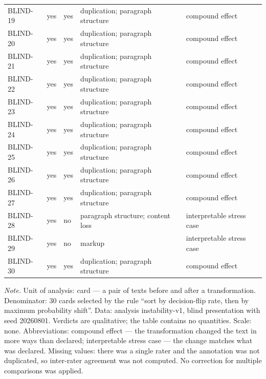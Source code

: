 \begin{longtable}{lllll}
BLIND-19 & yes & yes & duplication; paragraph structure & compound effect \\
BLIND-20 & yes & yes & duplication; paragraph structure & compound effect \\
BLIND-21 & yes & yes & duplication; paragraph structure & compound effect \\
BLIND-22 & yes & yes & duplication; paragraph structure & compound effect \\
BLIND-23 & yes & yes & duplication; paragraph structure & compound effect \\
BLIND-24 & yes & yes & duplication; paragraph structure & compound effect \\
BLIND-25 & yes & yes & duplication; paragraph structure & compound effect \\
BLIND-26 & yes & yes & duplication; paragraph structure & compound effect \\
BLIND-27 & yes & yes & duplication; paragraph structure & compound effect \\
BLIND-28 & yes & no & paragraph structure; content loss & interpretable stress case \\
BLIND-29 & yes & no & markup & interpretable stress case \\
BLIND-30 & yes & yes & duplication; paragraph structure & compound effect \\
\end{longtable}
\begin{minipage}{\linewidth}\footnotesize\vspace{2pt}
\textit{Note.} Unit of analysis: card — a pair of texts before and after a transformation. Denominator: 30 cards selected by the rule ``sort by decision-flip rate, then by maximum probability shift''. Data: analysis instability-v1, blind presentation with seed 20260801. Verdicts are qualitative; the table contains no quantities. Scale: none. Abbreviations: compound effect — the transformation changed the text in more ways than declared; interpretable stress case — the change matches what was declared. Missing values: there was a single rater and the annotation was not duplicated, so inter-rater agreement was not computed. No correction for multiple comparisons was applied.
\end{minipage}
\endgroup
